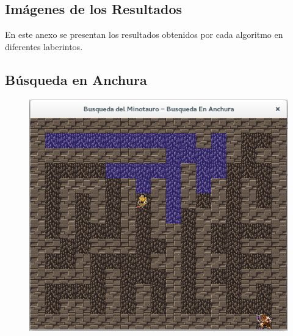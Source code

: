 \documentclass[letter, titlepage, 10pt]{article}
\begin{document}
\newpage
\begin{appendices}
  \renewcommand\thetable{\thesection\arabic{table}}
  \renewcommand\thefigure{\thesection\arabic{figure}}
  
  \section{Imágenes de los Resultados} 
    En este anexo se presentan los resultados obtenidos por cada algoritmo en diferentes laberintos.
  
  \subsection{Búsqueda en Anchura}
  \begin{figure}[H]
  \centering
    \begin{minipage}{.5\textwidth}
        \centering
        \includegraphics[width=\linewidth]{images/bea_01}
    \end{minipage}%
    \begin{minipage}{.5\textwidth}
        \centering

\end{minipage}
\end{figure}
\end{appendices}
\end{document}
